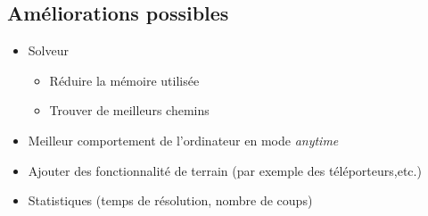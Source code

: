 \documentclass{beamer}
\begin{document}
\subsection{Améliorations possibles}
\begin{frame}
\begin{itemize}
\item Solveur
\begin{itemize}
\item Réduire la mémoire utilisée
\item Trouver de meilleurs chemins
\end{itemize}
\item Meilleur comportement de l'ordinateur en mode \textit{anytime}
\item Ajouter des fonctionnalité de terrain (par exemple des téléporteurs,etc.)
\item Statistiques (temps de résolution, nombre de coups)
\end{itemize}
\end{frame}
\end{document}
